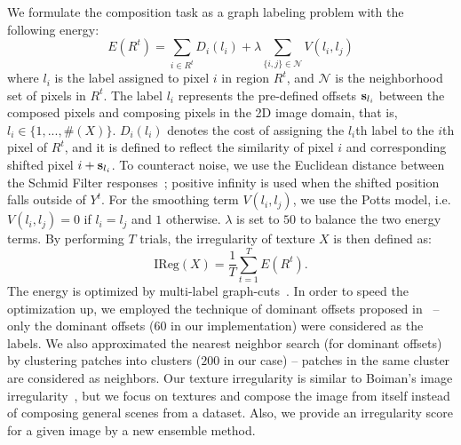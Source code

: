 We formulate the composition task
as a graph labeling problem with the following energy: 
\begin{equation}
  \label{eq:regu:energy}
  E(R^t) = \sum_{i\in R^t}D_i(l_i) + \lambda \sum_{\{i,j\} \in \mathcal{N}}V(l_i, l_j)
\end{equation}
where $l_i$ is the label assigned to pixel $i$ in region $R^t$, and
$\mathcal{N}$ is the neighborhood set of pixels in $R^t$. The label
$l_i$ represents the pre-defined offsets $\bold{s}_{l_i}$ between the
composed pixels and composing pixels in the 2D image domain, that is,
$l_i \in \{1, ..., \#(X)\}$.  $D_i(l_i)$ denotes the cost of assigning
the $l_i$th label to the $i$th pixel of $R^t$, and it is defined to
reflect the similarity of pixel $i$ and corresponding shifted pixel
$i+\bold{s}_{l_i}$. To counteract noise, we use the Euclidean distance
between the Schmid Filter responses~\citep{Schmid01}; positive infinity
is used when the shifted position falls outside of $Y^t$. For the
smoothing term $V(l_i, l_j)$, we use the Potts model, i.e. $V(l_i,l_j)
= 0$ if $l_i = l_j$ and $1$ otherwise. $\lambda$ is set to $50$ to
balance the two energy terms.  By performing $T$ trials, the
irregularity of texture $X$ is then defined as:
\begin{equation}
  \label{eq:regularity}
  \text{IReg}(X) = \frac{1}{T} \sum_{t=1}^{T}E(R^t). 
\end{equation}
The energy is optimized by multi-label graph-cuts~\citep{graphcut}.  In
order to speed the optimization up, we employed the technique of
dominant offsets proposed in~\citep{He:completion:eccv12} -- only the
dominant offsets ($60$ in our implementation) were considered as the
labels. We also approximated the nearest neighbor search (for
dominant offsets) by clustering patches into clusters ($200$ in our
case) -- patches in the same cluster are considered as neighbors. Our
texture irregularity is similar to Boiman's image
irregularity~\citep{Boiman:07}, but we focus on textures and
compose the image from itself instead of composing general scenes from a
dataset. Also, we provide an irregularity score for a given image by a
new ensemble method.

